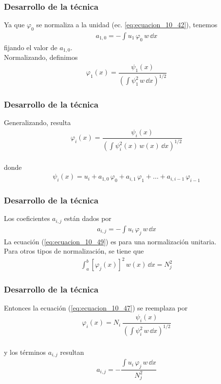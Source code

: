 \begin{frame}
\frametitle{Desarrollo de la técnica}
Ya que $\varphi_{0}$ se normaliza a la unidad (ec. \ref{eq:ecuacion_10_42}), tenemos
\begin{align}
a_{1,0} = - \int u_{1} \, \varphi_{0} \, w \, \dd{x}
\label{eq:ecuacion_10_45}
\end{align}
fijando el valor de $a_{1, 0}$.
\\
\bigskip
\pause
Normalizando, definimos
\begin{align}
\varphi_{1} (x) = \dfrac{\psi_{1}(x)}{\left( \displaystyle \int \psi_{1}^{2} \, w \, \dd{x} \right)^{1/2}}
\label{eq:ecuacion_10_46}
\end{align}
\end{frame}
\begin{frame}
\frametitle{Desarrollo de la técnica}
Generalizando, resulta
\begin{align}
\varphi_{i}(x) = \dfrac{\psi_{i}(x)}{\left( \displaystyle \int \psi_{i}^{2}(x) \, w(x) \, \dd{x} \right)^{1/2}}
\label{eq:ecuacion_10_47}
\end{align}
\\
\bigskip
\pause
donde
\begin{align}
\psi_{i}(x) = u_{i} + a_{1, 0} \, \varphi_{0} + a_{i, 1} \, \varphi_{1} + \ldots + a_{i, i-1} \, \varphi_{i-1}
\label{eq:ecuacion_10_48}
\end{align}
\end{frame}
\begin{frame}
\frametitle{Desarrollo de la técnica}
Los coeficientes $a_{i, j}$ están dados por
\begin{align}
a_{i, j} = - \int u_{i} \, \varphi_{j} \, w \, \dd{x}
\label{eq:ecuacion_10_49}
\end{align}
La ecuación (\ref{eq:ecuacion_10_49}) es para una normalización unitaria.
\\
\bigskip
\pause
Para otros tipos de normalización, se tiene que
\begin{align*}
\int_{a}^{b} \left[ \varphi_{j} (x) \right]^{2} \, w(x) \, \dd{x} =  N_{j}^{2}
\end{align*}
\end{frame}
\begin{frame}
\frametitle{Desarrollo de la técnica}
Entonces la ecuación (\ref{eq:ecuacion_10_47}) se reemplaza por
\begin{align}
\varphi_{i}(x) =  N_{i} \: \dfrac{\psi_{i}(x)}{\left( \displaystyle \int \psi_{i}^{2} \, w \, \dd{x} \right)^{1/2}}
\label{eq:ecuacion_10_47a}
\end{align}
\\
\bigskip
\pause
y los términos $a_{i,j}$ resultan
\begin{align}
a_{i, j} = - \dfrac{ \displaystyle \int u_{i} \, \varphi_{j} \, w \, \dd{x}}{N_{j}^{2}}
\label{eq:ecuacion_10_49a}
\end{align}
\end{frame}

